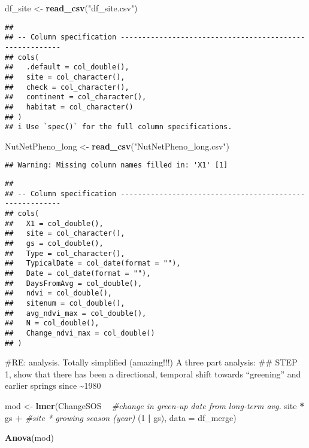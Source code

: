 \documentclass[
]{article}
\newenvironment{Shaded}{\begin{snugshade}}{\end{snugshade}}
\newcommand{\CommentTok}[1]{\textcolor[rgb]{0.56,0.35,0.01}{\textit{#1}}}
\newcommand{\DataTypeTok}[1]{\textcolor[rgb]{0.13,0.29,0.53}{#1}}
\newcommand{\DecValTok}[1]{\textcolor[rgb]{0.00,0.00,0.81}{#1}}
\newcommand{\KeywordTok}[1]{\textcolor[rgb]{0.13,0.29,0.53}{\textbf{#1}}}
\newcommand{\NormalTok}[1]{#1}
\newcommand{\OperatorTok}[1]{\textcolor[rgb]{0.81,0.36,0.00}{\textbf{#1}}}
\newcommand{\StringTok}[1]{\textcolor[rgb]{0.31,0.60,0.02}{#1}}
\begin{document}
\begin{Shaded}
\begin{Highlighting}[]
\NormalTok{df_site <-}\StringTok{ }\KeywordTok{read_csv}\NormalTok{(}\StringTok{"df_site.csv"}\NormalTok{)}
\end{Highlighting}
\end{Shaded}

\begin{verbatim}
## 
## -- Column specification --------------------------------------------------------
## cols(
##   .default = col_double(),
##   site = col_character(),
##   check = col_character(),
##   continent = col_character(),
##   habitat = col_character()
## )
## i Use `spec()` for the full column specifications.
\end{verbatim}

\begin{Shaded}
\begin{Highlighting}[]
\NormalTok{NutNetPheno_long <-}\StringTok{ }\KeywordTok{read_csv}\NormalTok{(}\StringTok{"NutNetPheno_long.csv"}\NormalTok{)}
\end{Highlighting}
\end{Shaded}

\begin{verbatim}
## Warning: Missing column names filled in: 'X1' [1]
\end{verbatim}

\begin{verbatim}
## 
## -- Column specification --------------------------------------------------------
## cols(
##   X1 = col_double(),
##   site = col_character(),
##   gs = col_double(),
##   Type = col_character(),
##   TypicalDate = col_date(format = ""),
##   Date = col_date(format = ""),
##   DaysFromAvg = col_double(),
##   ndvi = col_double(),
##   sitenum = col_double(),
##   avg_ndvi_max = col_double(),
##   N = col_double(),
##   Change_ndvi_max = col_double()
## )
\end{verbatim}

\#RE: analysis. Totally simplified (amazing!!!) A three part analysis:
\#\# STEP 1, show that there has been a directional, temporal shift
towards ``greening'' and earlier springs since \textasciitilde1980

\begin{Shaded}
\begin{Highlighting}[]
\NormalTok{mod <-}\StringTok{ }\KeywordTok{lmer}\NormalTok{(ChangeSOS }\OperatorTok{~}\StringTok{ }\CommentTok{#change in green-up date from long-term avg.}
\StringTok{              }\NormalTok{site }\OperatorTok{*}\StringTok{ }\NormalTok{gs }\OperatorTok{+}\StringTok{ }\CommentTok{#site * growing season (year)}
\StringTok{              }\NormalTok{(}\DecValTok{1} \OperatorTok{|}\StringTok{ }\NormalTok{gs),}
              \DataTypeTok{data =}\NormalTok{ df_merge)}

\KeywordTok{Anova}\NormalTok{(mod)}
\end{Highlighting}
\end{Shaded}
\end{document}
